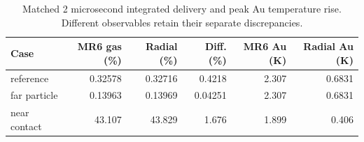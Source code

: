 \begin{table}[H]\centering\small
\begin{tabular}{lrrrrr}
\toprule
Case & MR6 gas (\%) & Radial (\%) & Diff. (\%) & MR6 Au (K) & Radial Au (K) \\ \midrule
reference & 0.32578 & 0.32716 & 0.4218 & 2.307 & 0.6831 \\
far particle & 0.13963 & 0.13969 & 0.04251 & 2.307 & 0.6831 \\
near contact & 43.107 & 43.829 & 1.676 & 1.899 & 0.406 \\
\bottomrule\end{tabular}
\caption{Matched 2 microsecond integrated delivery and peak Au temperature rise. Different observables retain their separate discrepancies.}
\end{table}
